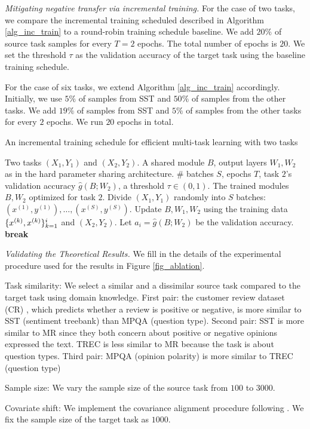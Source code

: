 \textit{Mitigating negative transfer via incremental training.}
For the case of two tasks, we compare the incremental training scheduled described in Algorithm \ref{alg_inc_train}  to a round-robin training schedule baseline.
We add $20\%$ of source task samples for every $T = 2$ epochs.
The total number of epochs is $20$.
We set the threshold $\tau$ as the validation accuracy of the target task using the baseline training schedule.

For the case of six tasks, we extend Algorithm \ref{alg_inc_train} accordingly.
Initially, we use $5\%$ of samples from SST and $50\%$ of samples from the other tasks.
We add $19\%$ of samples from SST and $5\%$ of samples from the other tasks for every $2$ epochs.
We run $20$ epochs in total.

\begin{algorithm}[!t]
	\caption{An incremental training schedule for efficient multi-task learning with two tasks}
	\label{alg_inc_train}
	\begin{algorithmic}[1]
		\Input Two tasks $(X_1, Y_1)$ and $(X_2, Y_2)$.
		\Param A shared module $B$, output layers $W_1, W_2$ as in the hard parameter sharing architecture.
		\Req \# batches $S$, epochs $T$, task $2$'s validation accuracy $\hat{g}(B; W_2)$, a threshold $\tau\in(0,1)$.
		\Output The trained modules $B, W_2$ optimized for task $2$.
		\State Divide $(X_1, Y_1)$ randomly into $S$ batches: $(x^{(1)}, y^{(1)}), \dots, (x^{(S)}, y^{(S)})$.
				\State Update $B, W_1, W_2$ using the training data $\{x^{(k)}, x^{(k)}\}_{k=1}^i$ and  $(X_2, Y_2)$.
			\EndFor
			\State Let $a_i = \hat{g}(B; W_2)$ be the validation accuracy.
				\State \textbf{break}
			\EndIf
		\EndFor
	\end{algorithmic}
\end{algorithm}




\textit{Validating the Theoretical Results.}
We fill in the details of the experimental procedure used for the results in Figure \ref{fig_ablation}.
\squishlist
	\item Task similarity: We select a similar and a dissimilar source task compared to the target task using domain knowledge.
First pair: the customer review dataset (CR) , which predicts whether a review is positive or negative, is more similar to SST (sentiment treebank) than MPQA (question type).
Second pair: SST is more similar to MR since they both concern about positive or negative opinions expressed the text.
TREC is less similar to MR because the task is about question types.
Third pair: MPQA (opinion polarity) is more similar to TREC (question type)
	\item Sample size: We vary the sample size of the source task from $100$ to $3000$.
	\item Covariate shift: We implement the covariance alignment procedure following \cite{WZR20}.
	We fix the sample size of the target task as $1000$.
\squishend


